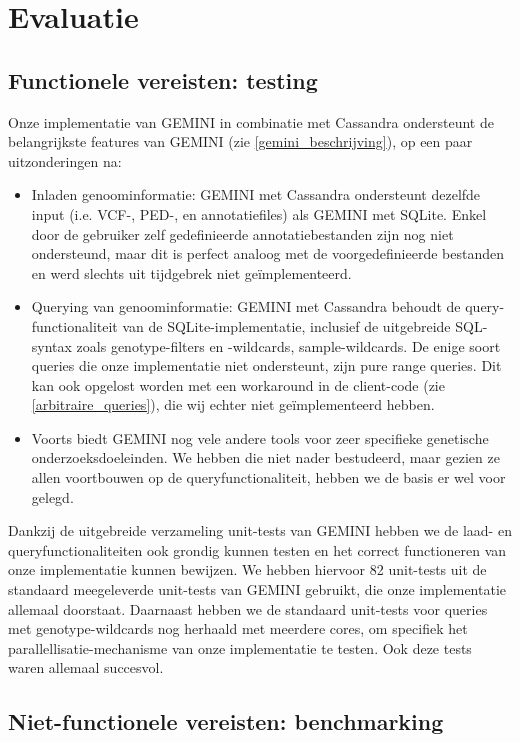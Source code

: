 \chapter{Evaluatie}

\section{Functionele vereisten: testing}

Onze implementatie van GEMINI in combinatie met Cassandra ondersteunt de belangrijkste features van GEMINI (zie \ref{gemini_beschrijving}), op een paar uitzonderingen na:
\begin{itemize}
\item Inladen genoominformatie: GEMINI met Cassandra ondersteunt dezelfde input (i.e. VCF-, PED-, en annotatiefiles) als GEMINI met SQLite. Enkel door de gebruiker zelf gedefinieerde annotatiebestanden zijn nog niet ondersteund, maar dit is perfect analoog met de voorgedefinieerde bestanden en werd slechts uit tijdgebrek niet ge\"implementeerd.
\item Querying van genoominformatie: GEMINI met Cassandra behoudt de query-functionaliteit van de SQLite-implementatie, inclusief de uitgebreide SQL-syntax zoals genotype-filters en -wildcards, sample-wildcards. De enige soort queries die onze implementatie niet ondersteunt, zijn pure range queries. Dit kan ook opgelost worden met een workaround in de client-code (zie \ref{arbitraire_queries}), die wij echter niet ge\"implementeerd hebben.
\item Voorts biedt GEMINI nog vele andere tools voor zeer specifieke genetische onderzoeksdoeleinden. We hebben die niet nader bestudeerd, maar gezien ze allen voortbouwen op de queryfunctionaliteit, hebben we de basis er wel voor gelegd.
\end{itemize}

Dankzij de uitgebreide verzameling unit-tests van GEMINI hebben we de laad- en queryfunctionaliteiten ook grondig kunnen testen en het correct functioneren van onze implementatie kunnen bewijzen. We hebben hiervoor 82 unit-tests uit de standaard meegeleverde unit-tests van GEMINI gebruikt, die onze implementatie allemaal doorstaat. Daarnaast hebben we de standaard unit-tests voor queries met genotype-wildcards nog herhaald met meerdere cores, om specifiek het parallellisatie-mechanisme van onze implementatie te testen. Ook deze tests waren allemaal succesvol.

\section{Niet-functionele vereisten: benchmarking}

